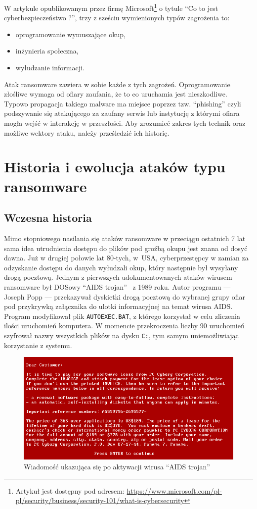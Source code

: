 W artykule opublikowanym przez firmę Microsoft\footnote{Artykuł jest dostępny pod adresem: \url{https://www.microsoft.com/pl-pl/security/business/security-101/what-is-cybersecurity}} o tytule \enquote{Co to jest cyberbezpieczeństwo ?}, trzy z sześciu wymienionych typów zagrożenia to: 
\begin{itemize}
    \item oprogramowanie wymuszające okup,
    \item inżynieria społeczna,
    \item wyłudzanie informacji.
\end{itemize}
Atak ransomware zawiera w sobie każde z tych zagrożeń.
Oprogramowanie złośliwe wymaga od ofiary zaufania, że to co uruchamia jest nieszkodliwe. Typowo propagacja takiego malware ma miejsce poprzez tzw. 
\foreignquote{english}{phishing} czyli podszywanie się atakującego za zaufany serwis lub instytucję z którymi ofiara mogła wejść w interakcję w przeszłości. 
Aby zrozumieć zakres tych technik oraz możliwe wektory ataku, należy prześledzić ich historię.
\section{Historia i ewolucja ataków typu ransomware}
\label{sec:his}
\subsection{Wczesna historia}
Mimo stopniowego nasilania się ataków ransomware w przeciągu ostatnich 7 lat sama idea utrudnienia
dostępu do plików pod groźbą okupu jest znana od dosyć dawna. Już w drugiej połowie lat 80-tych, w~USA,
cyberprzestępcy w zamian za odzyskanie dostępu do danych wyłudzali okup, który następnie był wysyłany drogą pocztową. Jednym z pierwszych udokumentowanych ataków wirusem ransomware był DOSowy \foreignquote{english}{AIDS trojan}~\cite{virus_1990} z 1989 roku. Autor programu — Joseph Popp — przekazywał dyskietki drogą pocztową do wybranej grupy ofiar pod przykrywką załącznika do ulotki informacyjnej na temat wirusa AIDS. Program modyfikował plik \texttt{AUTOEXEC.BAT}, z którego korzystał w celu zliczenia ilości uruchomień komputera. W momencie przekroczenia liczby 90 uruchomień szyfrował nazwy wszystkich plików na dysku \texttt{C:\/}, tym samym uniemożliwiając korzystanie z systemu.

\begin{figure}[H]
    \centering
    \includegraphics[width=0.6\linewidth]{rysunki/aids-trojan.png}
    \caption{Wiadomość ukazująca się po aktywacji wirusa \foreignquote{english}{AIDS trojan}\protect\footnotemark}
    \label{fig:enter-label}
\end{figure}

